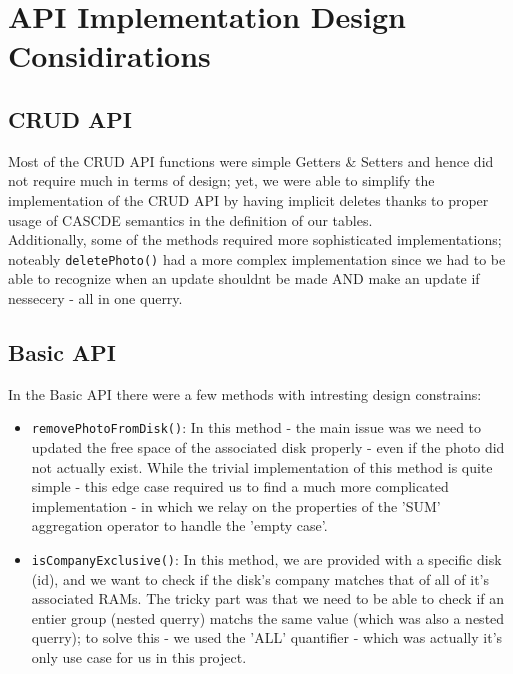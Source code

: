 \section{API Implementation Design Considirations}
\subsection{CRUD API}
Most of the CRUD API functions were simple Getters \& Setters
and hence did not require much in terms of design; yet,
we were able to simplify the implementation of the CRUD API
by having implicit deletes thanks to proper usage of CASCDE
semantics in the definition of our tables.\\
Additionally, some of the methods required more sophisticated
implementations; noteably \texttt{deletePhoto()} had a more complex implementation
since we had to be able to recognize when
an update shouldnt be made AND make an update if nessecery - all in one querry.

\subsection{Basic API}
In the Basic API there were a few methods with intresting
design constrains:
\begin{itemize}
	\item \texttt{removePhotoFromDisk()}:
		In this method - the main issue was we need to updated
		the free space of the associated disk properly - even if the
		photo did not actually exist. While the trivial implementation of
		this method is quite simple - this edge case required us to find
		a much more complicated implementation - in which we
		relay on the properties of the 'SUM' aggregation operator
		to handle the 'empty case'.
	\item \texttt{isCompanyExclusive()}:
		In this method, we are provided with a specific disk (id),
		and we want to check if the disk's company matches that of all of it's
		associated RAMs. The tricky part was that we need to be able
		to check if an entier group (nested querry) matchs the same value (which was also a nested querry);
		to solve this - we used the 'ALL' quantifier - which was actually it's only use
		case for us in this project.
\end{itemize}

